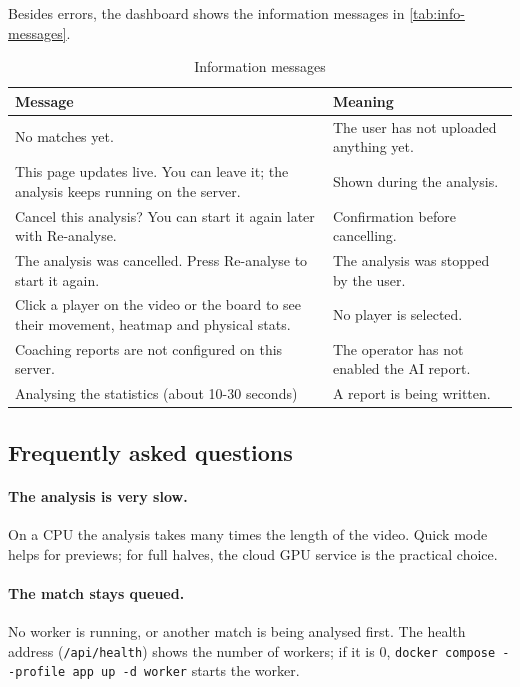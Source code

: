 Besides errors, the dashboard shows the information messages in \autoref{tab:info-messages}.

\begin{table}[H]
	\centering
	\begin{tabular}{|p{}|p{}|}
		\hline
		\textbf{Message} & \textbf{Meaning} \\
		\hline
		No matches yet. & The user has not uploaded anything yet. \\
		\hline
		This page updates live. You can leave it; the analysis keeps running on the server. & Shown during the analysis. \\
		\hline
		Cancel this analysis? You can start it again later with Re-analyse. & Confirmation before cancelling. \\
		\hline
		The analysis was cancelled. Press Re-analyse to start it again. & The analysis was stopped by the user. \\
		\hline
		Click a player on the video or the board to see their movement, heatmap and physical stats. & No player is selected. \\
		\hline
		Coaching reports are not configured on this server. & The operator has not enabled the AI report. \\
		\hline
		Analysing the statistics (about 10-30 seconds) & A report is being written. \\
		\hline
	\end{tabular}
	\caption{Information messages}
	\label{tab:info-messages}
\end{table}

\subsection*{Frequently asked questions}

\paragraph{The analysis is very slow.} On a CPU the analysis takes many times the length of the video. Quick mode helps for previews; for full halves, the cloud GPU service is the practical choice.

\paragraph{The match stays queued.} No worker is running, or another match is being analysed first. The health address (\texttt{/api/health}) shows the number of workers; if it is 0, \texttt{docker compose -{}-profile app up -d worker} starts the worker.

